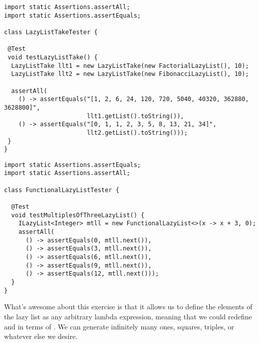 \begin{cl}[]{}
\begin{lstlisting}[language=MyJava]
import static Assertions.assertAll;
import static Assertions.assertEquals;

class LazyListTakeTester {

 @Test
 void testLazyListTake() {
  LazyListTake llt1 = new LazyListTake(new FactorialLazyList(), 10);
  LazyListTake llt2 = new LazyListTake(new FibonacciLazyList(), 10);

  assertAll(
    () -> assertEquals("[1, 2, 6, 24, 120, 720, 5040, 40320, 362880, 3628800]",
                       llt1.getList().toString()),
    () -> assertEquals("[0, 1, 1, 2, 3, 5, 8, 13, 21, 34]",
                       llt2.getList().toString()));
 }
}
\end{lstlisting}
\end{cl}


\begin{cl}[]{}
\begin{lstlisting}[language=MyJava]
import static Assertions.assertEquals;
import static Assertions.assertAll;

class FunctionalLazyListTester {

  @Test
  void testMultiplesOfThreeLazyList() {
    ILazyList<Integer> mtll = new FunctionalLazyList<>(x -> x + 3, 0);
    assertAll(
      () -> assertEquals(0, mtll.next()),
      () -> assertEquals(3, mtll.next()),
      () -> assertEquals(6, mtll.next()),
      () -> assertEquals(9, mtll.next()),
      () -> assertEquals(12, mtll.next()));
  }
}
\end{lstlisting}
\end{cl}

What's awesome about this exercise is that it allows us to define the elements of the lazy list as any arbitrary lambda expression, meaning that we could redefine  and  in terms of . We can generate infinitely many ones, squares, triples, or whatever else we desire.

